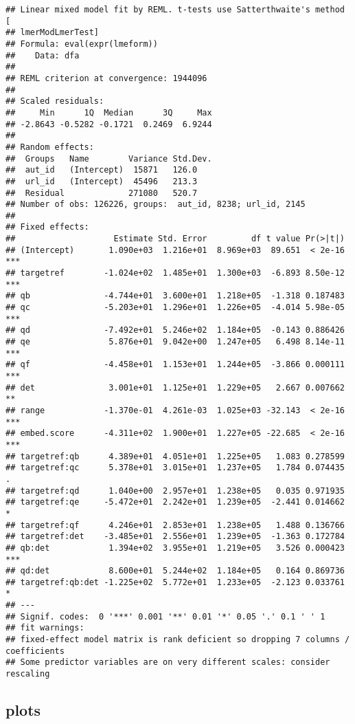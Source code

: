 \documentclass[
  12pt,
  oneside]{book}
\begin{document}
\begin{verbatim}
## Linear mixed model fit by REML. t-tests use Satterthwaite's method [
## lmerModLmerTest]
## Formula: eval(expr(lmeform))
##    Data: dfa
## 
## REML criterion at convergence: 1944096
## 
## Scaled residuals: 
##     Min      1Q  Median      3Q     Max 
## -2.8643 -0.5282 -0.1721  0.2469  6.9244 
## 
## Random effects:
##  Groups   Name        Variance Std.Dev.
##  aut_id   (Intercept)  15871   126.0   
##  url_id   (Intercept)  45496   213.3   
##  Residual             271080   520.7   
## Number of obs: 126226, groups:  aut_id, 8238; url_id, 2145
## 
## Fixed effects:
##                    Estimate Std. Error         df t value Pr(>|t|)    
## (Intercept)       1.090e+03  1.216e+01  8.969e+03  89.651  < 2e-16 ***
## targetref        -1.024e+02  1.485e+01  1.300e+03  -6.893 8.50e-12 ***
## qb               -4.744e+01  3.600e+01  1.218e+05  -1.318 0.187483    
## qc               -5.203e+01  1.296e+01  1.226e+05  -4.014 5.98e-05 ***
## qd               -7.492e+01  5.246e+02  1.184e+05  -0.143 0.886426    
## qe                5.876e+01  9.042e+00  1.247e+05   6.498 8.14e-11 ***
## qf               -4.458e+01  1.153e+01  1.244e+05  -3.866 0.000111 ***
## det               3.001e+01  1.125e+01  1.229e+05   2.667 0.007662 ** 
## range            -1.370e-01  4.261e-03  1.025e+03 -32.143  < 2e-16 ***
## embed.score      -4.311e+02  1.900e+01  1.227e+05 -22.685  < 2e-16 ***
## targetref:qb      4.389e+01  4.051e+01  1.225e+05   1.083 0.278599    
## targetref:qc      5.378e+01  3.015e+01  1.237e+05   1.784 0.074435 .  
## targetref:qd      1.040e+00  2.957e+01  1.238e+05   0.035 0.971935    
## targetref:qe     -5.472e+01  2.242e+01  1.239e+05  -2.441 0.014662 *  
## targetref:qf      4.246e+01  2.853e+01  1.238e+05   1.488 0.136766    
## targetref:det    -3.485e+01  2.556e+01  1.239e+05  -1.363 0.172784    
## qb:det            1.394e+02  3.955e+01  1.219e+05   3.526 0.000423 ***
## qd:det            8.600e+01  5.244e+02  1.184e+05   0.164 0.869736    
## targetref:qb:det -1.225e+02  5.772e+01  1.233e+05  -2.123 0.033761 *  
## ---
## Signif. codes:  0 '***' 0.001 '**' 0.01 '*' 0.05 '.' 0.1 ' ' 1
## fit warnings:
## fixed-effect model matrix is rank deficient so dropping 7 columns / coefficients
## Some predictor variables are on very different scales: consider rescaling
\end{verbatim}

\subsection{plots}\label{plots-3}
\end{document}
